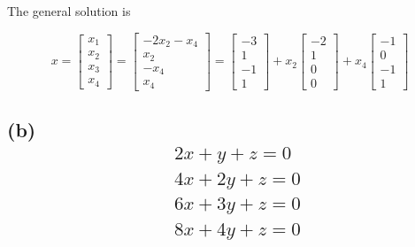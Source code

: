 \documentclass{article}
\begin{document}
	The general solution is
	
	\[
	x=
	\left[
		\begin{array}{c}
			x_1\\
			x_2\\
			x_3\\
			x_4
		\end{array}
	\right]
	=
	\left[
		\begin{array}{c}
			-2x_2-x_4\\
			x_2\\
			-x_4\\
			x_4
		\end{array}
	\right]
	=
	\left[
		\begin{array}{c}
		-3\\
		1\\
		-1\\
		1
		\end{array}
	\right]
	+x_2
	\left[
		\begin{array}{c}
		-2\\
		1\\
		0\\
		0
		\end{array}
	\right]
	+x_4
	\left[
	\begin{array}{c}
		-1\\
		0\\
		-1\\
		1
	\end{array}
	\right]
	\]

	
	\subsection*{(b)
		\begin{align*}
			&2x+y+z=0\\		
			&4x+2y+z=0\\	
			&6x+3y+z=0\\
			&8x+4y+z=0
		\end{align*}
	}
	
\end{document}
